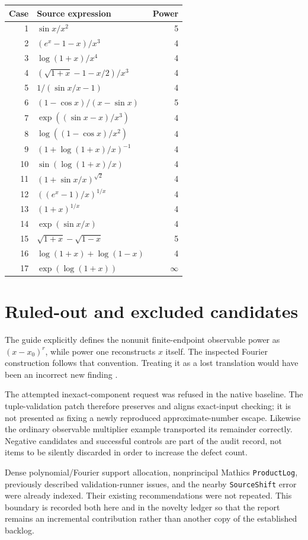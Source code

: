 \documentclass[11pt,letterpaper]{article}
\theoremstyle{remark}\newtheorem{remark}[theorem]{Remark}
\newcommand{\code}[1]{\texttt{#1}}
\begin{document}
\begin{longtable}{@{}rp{}r@{}}
\toprule
Case & Source expression & Power\\
\midrule\endhead
1 & $\sin x/x^2$ & 5\\
2 & $(e^x-1-x)/x^3$ & 4\\
3 & $\log(1+x)/x^4$ & 4\\
4 & $(\sqrt{1+x}-1-x/2)/x^3$ & 4\\
5 & $1/(\sin x/x-1)$ & 4\\
6 & $(1-\cos x)/(x-\sin x)$ & 5\\
7 & $\exp((\sin x-x)/x^3)$ & 4\\
8 & $\log((1-\cos x)/x^2)$ & 4\\
9 & $(1+\log(1+x)/x)^{-1}$ & 4\\
10 & $\sin(\log(1+x)/x)$ & 4\\
11 & $(1+\sin x/x)^{\sqrt2}$ & 4\\
12 & $((e^x-1)/x)^{1/x}$ & 4\\
13 & $(1+x)^{1/x}$ & 4\\
14 & $\exp(\sin x/x)$ & 4\\
15 & $\sqrt{1+x}-\sqrt{1-x}$ & 5\\
16 & $\log(1+x)+\log(1-x)$ & 4\\
17 & $\exp(\log(1+x))$ & $\infty$\\
\bottomrule
\end{longtable}

\section{Ruled-out and excluded candidates}
The guide explicitly defines the nonunit finite-endpoint observable power as
$(x-x_0)^r$, while power one reconstructs $x$ itself. The inspected Fourier
construction follows that convention. Treating it as a lost translation would
have been an incorrect new finding \cite{guide}.

The attempted inexact-component request was refused in the native baseline.
The tuple-validation patch therefore preserves and aligns exact-input checking;
it is not presented as fixing a newly reproduced approximate-number escape.
Likewise the ordinary observable multiplier example transported its remainder
correctly. Negative candidates and successful controls are part of the audit
record, not items to be silently discarded in order to increase the defect count.

Dense polynomial/Fourier support allocation, nonprincipal Mathics
\code{ProductLog}, previously described validation-runner issues, and the
nearby \code{SourceShift} error were already indexed. Their existing
recommendations were not repeated. This boundary is recorded both here and in
the novelty ledger so that the report remains an incremental contribution
rather than another copy of the established backlog.
\end{document}
